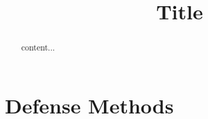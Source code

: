 \documentclass{article}
\begin{document}
	
	\def\x{{\mathbf x}}
	\def\L{{\cal L}}
	
	
	\title{Title}
	
	
	\address{$^{\#}$Rajshahi University of Engineering \& Technology, Rajshahi,  Bangladesh}
	
	\maketitle
\begin{abstract}
	content...
\end{abstract}

\section{Defense Methods}
\label{sec:Defense Methods}
\end{document}
